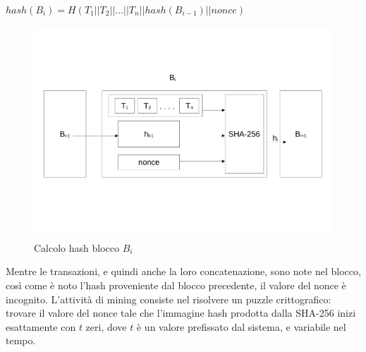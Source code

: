 \begin{center}
    $hash(B_i) = H(T_1||T_2||...||T_n||hash(B_{i-1})||nonce)$
\end{center}
\begin{figure}[h!]
    \centering
    \includegraphics[scale=0.5, trim = 1cm 4cm 0cm 4cm, clip]{Images/blocchi_sha.pdf}
    \caption{Calcolo hash blocco $B_i$}
    \label{fig:sha-256}
\end{figure}
\FloatBarrier
Mentre le transazioni, e quindi anche la loro concatenazione, sono note nel blocco, così come è noto l’hash proveniente dal blocco precedente, il valore del nonce è incognito. L’attività di mining consiste nel risolvere un puzzle crittografico: trovare il valore del nonce tale che l’immagine hash prodotta dalla SHA-256 inizi esattamente con $t$ zeri, dove $t$ è un valore prefissato dal sistema, e variabile nel tempo.\\
